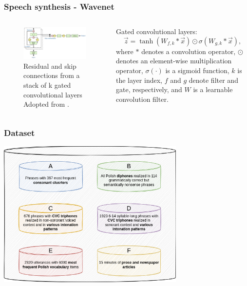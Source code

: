 \documentclass[a4paper,9pt]{beamer}
\theoremstyle{mytheoremstyle}
\begin{document}
\begin{frame}
\frametitle{Speech synthesis - Wavenet}
\begin{columns}
\begin{figure}
\begin{center}
  \includegraphics[width=\textwidth]{res/residual_blocks.png}
\end{center}
	\caption{Residual and skip connections from a stack of k gated convolutional layers Adopted from \parencite{vandenoord2016a}.}
\end{figure}
\begin{exampleblock}{}
\tiny{Gated convolutional layers:
\begin{equation}
\vec{z} = \tanh \left(W_{f, k} \ast \vec{x}\right) \odot \sigma \left(W_{g, k} \ast \vec{x} \right), 
\end{equation}
where $\ast$ denotes a convolution operator, $\odot$ denotes an element-wise multiplication operator, $\sigma(\cdot)$ is a sigmoid function, $k$ is the layer index, $f$ and $g$ denote filter and gate, respectively, and $W$ is a learnable convolution filter.}
\end{exampleblock}
\end{columns}
\end{frame}

\begin{frame}
\frametitle{Dataset}
\begin{center}
  \includegraphics[width=0.7\textwidth]{res/dataset_structure}
\end{center}
\end{frame}
\end{document}
